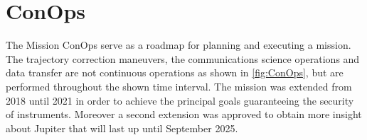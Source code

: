 \section{ConOps}
\label{sec:conops}

The Mission ConOps serve as a roadmap for planning and executing a mission. The trajectory correction maneuvers, the communications science operations and data transfer are not continuous operations as shown in \autoref{fig:ConOps}, but are performed throughout the shown time interval.
The mission was extended from 2018 until 2021 in order to achieve the principal goals guaranteeing the security of instruments. Moreover a second extension was approved to obtain more insight about Jupiter that will last up until September 2025.

